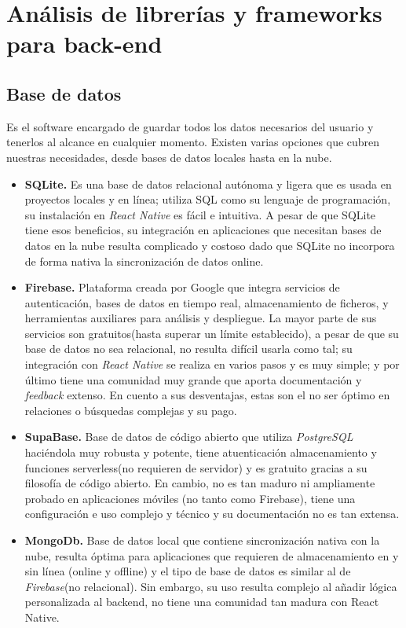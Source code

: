 \documentclass[twoside, openright, 11pt]{report}
\begin{document}
  
	\section{Análisis de librerías y frameworks para back-end}
		
		\subsection{Base de datos}
		Es el software encargado de guardar todos los datos necesarios del usuario y tenerlos al alcance en cualquier momento. Existen varias opciones que cubren nuestras necesidades, desde bases de datos locales hasta en la nube.
		\begin{itemize}
			\item \textbf{SQLite.} Es una base de datos relacional autónoma y ligera que es usada en proyectos locales y en línea; utiliza SQL como su lenguaje de programación, su instalación en \textit{React Native} es fácil e intuitiva. A pesar de que SQLite tiene esos beneficios, su integración en aplicaciones que necesitan bases de datos en la nube resulta complicado y costoso dado que SQLite no incorpora de forma nativa la sincronización de datos online.
			\item \textbf{Firebase.} Plataforma creada por Google que integra servicios de autenticación, bases de datos en tiempo real, almacenamiento de ficheros, y herramientas auxiliares para análisis y despliegue. La mayor parte de sus servicios son gratuitos(hasta superar un límite establecido), a pesar de que su base de datos no sea relacional, no resulta difícil usarla como tal; su integración con \textit{React Native} se realiza en varios pasos y es muy simple; y por último tiene una comunidad muy grande que aporta documentación y \textit{feedback} extenso. En cuento a sus desventajas, estas son el no ser óptimo en relaciones o búsquedas complejas y su pago.
			\item \textbf{SupaBase. } Base de datos de código abierto que utiliza 
			\textit{PostgreSQL} haciéndola muy robusta y potente, tiene atuenticación almacenamiento y funciones serverless(no requieren de servidor) y es gratuito gracias a su filosofía de código abierto. En cambio, no es tan maduro ni ampliamente probado en aplicaciones móviles (no tanto como Firebase), tiene una configuración e uso complejo y técnico y su documentación no es tan extensa.
			\item \textbf{MongoDb. } Base de datos local que contiene sincronización nativa con la nube, resulta óptima para aplicaciones que requieren de almacenamiento en y sin línea (online y offline) y el tipo de base de datos es similar al de \textit{Firebase}(no relacional). Sin embargo, su uso resulta complejo al añadir lógica personalizada al backend, no tiene una comunidad tan madura con React Native.
		\end{itemize}
	
\end{document}

